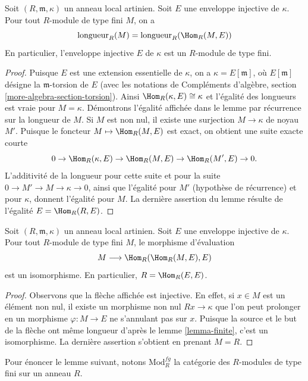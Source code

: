 \begin{lemma}
\label{lemma-finite}
Soit $(R, \mathfrak m, \kappa)$ un anneau local artinien.
Soit $E$ une enveloppe injective de $\kappa$. Pour tout
$R$-module de type fini $M$, on a
$$
\text{longueur}_R(M) = \text{longueur}_R(\Hom_R(M, E))
$$
En particulier, l'enveloppe injective $E$ de $\kappa$ est un $R$-module de type fini.
\end{lemma}

\begin{proof}
Puisque $E$ est une extension essentielle de $\kappa$, on a
$\kappa = E[\mathfrak m]$, où $E[\mathfrak m]$ désigne la $\mathfrak m$-torsion de $E$
(avec les notations de Compléments d'algèbre, section \ref{more-algebra-section-torsion}).
Ainsi $\Hom_R(\kappa, E) \cong \kappa$ et l'égalité des longueurs est vraie pour $M = \kappa$.
Démontrons l'égalité affichée dans le lemme par récurrence sur
la longueur de $M$. Si $M$ est non nul, il existe une surjection
$M \to \kappa$ de noyau $M'$. Puisque le foncteur $M \mapsto \Hom_R(M, E)$
est exact, on obtient une suite exacte courte
$$
0 \to \Hom_R(\kappa, E) \to \Hom_R(M, E) \to \Hom_R(M', E) \to 0.
$$
L'additivité de la longueur pour cette suite et pour la suite $0 \to M' \to M \to \kappa \to 0$,
ainsi que l'égalité pour $M'$ (hypothèse de récurrence) et pour $\kappa$,
donnent l'égalité pour $M$.
La dernière assertion du lemme résulte de l'égalité $E = \Hom_R(R, E)$.
\end{proof}

\begin{lemma}
\label{lemma-evaluate}
Soit $(R, \mathfrak m, \kappa)$ un anneau local artinien.
Soit $E$ une enveloppe injective de $\kappa$.
Pour tout $R$-module de type fini $M$, le morphisme d'évaluation
$$
M \longrightarrow \Hom_R(\Hom_R(M, E), E)
$$
est un isomorphisme. En particulier, $R = \Hom_R(E, E)$.
\end{lemma}

\begin{proof}
Observons que la flèche affichée est injective. En effet, si $x \in M$
est un élément non nul, il existe un morphisme non nul $Rx \to \kappa$ que l'on peut
prolonger en un morphisme $\varphi : M \to E$ ne s'annulant pas sur $x$.
Puisque la source et le but de la flèche ont même longueur d'après
le lemme \ref{lemma-finite}, c'est un isomorphisme.
La dernière assertion s'obtient en prenant $M = R$.
\end{proof}

\noindent
Pour énoncer le lemme suivant, notons $\text{Mod}^{fg}_R$ la catégorie des
$R$-modules de type fini sur un anneau $R$.

